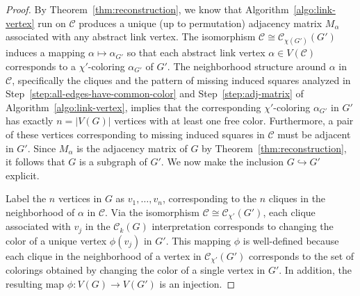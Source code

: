 \documentclass{amsart}
\theoremstyle{hypothesisstyle}
\theoremstyle{definition}
\theoremstyle{remark}
\numberwithin{equation}{section}
\newcommand{\C}{\mathcal C}
\begin{document}
\begin{proof}
    By Theorem~\ref{thm:reconstruction}, we know that Algorithm~\ref{algo:link-vertex} run on $\mathcal{C}$ produces a unique (up to permutation) adjacency matrix $M_\alpha$  associated with any abstract link vertex. The isomorphism $\C\cong\C_{\chi(G')}(G')$ induces a mapping $\alpha\mapsto\alpha_{G'}$ so that each abstract link vertex $\alpha\in V(\mathcal{C})$ corresponds to a $\chi'$-coloring $\alpha_{G'}$ of $G'$. The neighborhood structure around $\alpha$ in $\C$, specifically the cliques and the pattern of missing induced squares analyzed in Step~\ref{step:all-edges-have-common-color} and Step~\ref{step:adj-matrix} of Algorithm~\ref{algo:link-vertex}, implies that the corresponding $\chi'$-coloring $\alpha_{G'}$ in $G'$ has exactly $n=|V(G)|$ vertices with at least one free color. Furthermore, a pair of these vertices corresponding to missing induced squares in $\mathcal{C}$ must be adjacent in $G'$. Since $M_\alpha$ is the adjacency matrix of $G$ by Theorem~\ref{thm:reconstruction}, it follows that $G$ is a subgraph of $G'$. We now make the inclusion $G\hookrightarrow G'$ explicit.

    Label the $n$ vertices in $G$ as $v_1,\dots,v_n$, corresponding to the $n$ cliques in the neighborhood of $\alpha$ in $\mathcal{C}$. Via the isomorphism $\mathcal{C}\cong\mathcal{C}_{\chi'}(G')$, each clique associated with $v_j$ in the $\mathcal{C}_k(G)$ interpretation corresponds to changing the color of a unique vertex $\phi(v_j)$ in $G'$. This mapping $\phi$ is well-defined because each clique in the neighborhood of a vertex in $\C_{\chi'}(G')$ corresponds to the set of colorings obtained by changing the color of a single vertex in $G'$. In addition, the resulting map $\phi\colon V(G)\to V(G')$ is an injection. 
    

\end{proof}
\end{document}
